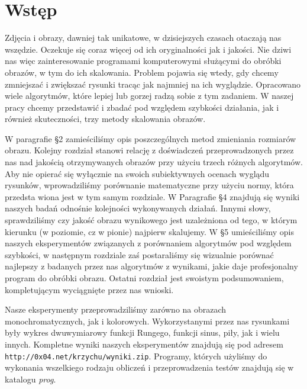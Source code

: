 \section{Wstęp}
Zdjęcia i obrazy, dawniej tak unikatowe, w dzisiejszych czasach otaczają nas
wszędzie. Oczekuje się coraz więcej od ich oryginalności jak i jakości. Nie
dziwi nas więc zainteresowanie programami komputerowymi służącymi do obróbki
obrazów, w tym do ich skalowania. Problem pojawia się wtedy, gdy chcemy zmniejszać i zwiększać
rysunki tracąc jak najmniej na ich wyglądzie. Opracowano wiele algorytmów,
które lepiej lub gorzej radzą sobie z tym zadaniem. W naszej pracy chcemy
przedstawić i zbadać pod względem szybkości działania, jak i również
skuteczności, trzy metody skalowania obrazów.

W paragrafie \S2 zamieściliśmy opis poszczególnych metod zmieniania
rozmiarów obrazu. Kolejny rozdział stanowi relację z doświadczeń
przeprowadzonych przez nas nad jakością otrzymywanych obrazów przy
użyciu trzech różnych algorytmów. Aby nie opierać się wyłącznie na swoich
subiektywnych ocenach wyglądu rysunków, wprowadziliśmy porównanie
matematyczne przy użyciu normy, która przedsta wiona jest w tym samym rozdziale.
W Paragrafie \S4 znajdują się wyniki naszych badań odnośnie kolejności
wykonywanych działań. Innymi słowy, sprawdziliśmy czy jakość obrazu
wynikowego jest uzależniona od tego, w którym kierunku (w poziomie, cz w pionie) najpierw skalujemy.
W \S5 umieściliśmy opis naszych eksperymentów związanych z porównaniem
algorytmów pod względem szybkości, w następnym rozdziale zaś
postaraliśmy się wizualnie porównać najlepszy z badanych przez nas algorytmów
z wynikami, jakie daje profesjonalny program do obróbki obrazu. Ostatni
rozdział jest swoistym podsumowaniem, kompletującym wyciągnięte przez nas
wnioski.

Nasze eksperymenty przeprowadziliśmy zarówno na obrazach monochromatycznych,
jak i kolorowych. Wykorzystanymi przez nas rysunkami były wykres dwuwymiarowy
funkcji Rungego, funkcji sinus, piły, jak i wielu innych. Kompletne wyniki naszych eksperymentów znajdują się
pod adresem \verb|http://0x04.net/krzychu/wyniki.zip|. Programy, których
użyliśmy do wykonania wszelkiego rodzaju obliczeń i przeprowadzenia testów znajdują się w katalogu \textit{prog}.

